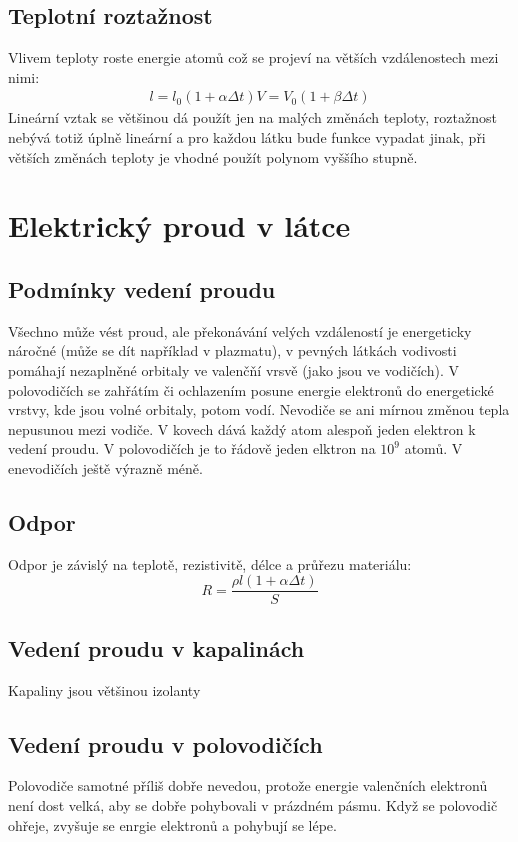 \documentclass[titlepage]{report}
\begin{document}
\section{Teplotní roztažnost}
Vlivem teploty roste energie atomů což se projeví na větších vzdálenostech mezi nimi:\\
\begin{align}
l = l_0 (1 + \alpha \Delta t)
V = V_0 (1 + \beta \Delta t)
\end{align}
Lineární vztak se většinou dá použít jen na malých změnách teploty, roztažnost nebývá totiž úplně lineární a pro každou látku bude funkce vypadat jinak, při větších změnách teploty je vhodné použít polynom vyššího stupně.
\chapter{Elektrický proud v látce}
\section{Podmínky vedení proudu}
Všechno může vést proud, ale překonávání velých vzdáleností je energeticky náročné (může se dít například v plazmatu), v pevných látkách vodivosti pomáhají nezaplněné orbitaly ve valenčňí vrsvě (jako jsou ve vodičích). V polovodičích se zahřátím či ochlazením posune energie elektronů do energetické vrstvy, kde jsou volné orbitaly, potom vodí. Nevodiče se ani mírnou změnou tepla nepusunou mezi vodiče. V kovech dává každý atom alespoň jeden elektron k vedení proudu. V polovodičích je to řádově jeden elktron na $10^{9}$ atomů. V enevodičích ještě výrazně méně.
\section{Odpor}
Odpor je závislý na teplotě, rezistivitě, délce a průřezu materiálu:\\
\begin{equation}
R = \frac{\rho l (1+ \alpha \Delta t)}{S}
\end{equation}
\section{Vedení proudu v kapalinách}
Kapaliny jsou většinou izolanty


\section{Vedení proudu v polovodičích}
Polovodiče samotné příliš dobře nevedou, protože energie valenčních elektronů není dost velká, aby se dobře pohybovali v prázdném pásmu. Když se polovodič ohřeje, zvyšuje se enrgie elektronů a pohybují se lépe.
\end{document}
